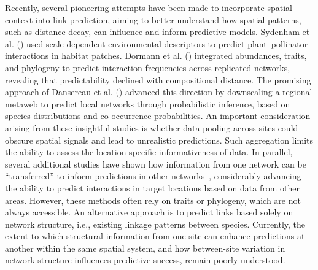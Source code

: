 \documentclass[oneside, a4paper, onecolumn, 11pt]{article}
\begin{document}
Recently, several pioneering attempts have been made to incorporate spatial context into link prediction, aiming to better understand how spatial patterns, such as distance decay, can influence and inform predictive models. Sydenham et al. (\citeyear{Sydenham2022-me}) used scale-dependent environmental descriptors to predict plant–pollinator interactions in habitat patches. Dormann et al. (\citeyear{Dormann2025-rz}) integrated abundances, traits, and phylogeny to predict interaction frequencies across replicated networks, revealing that predictability declined with compositional distance. The promising approach of Dansereau et al. (\citeyear{Dansereau2024-wt}) advanced this direction by downscaling a regional metaweb to predict local networks through probabilistic inference, based on species distributions and co-occurrence probabilities. An important consideration arising from these insightful studies is whether data pooling across sites could obscure spatial signals and lead to unrealistic predictions. Such aggregation limits the ability to assess the location-specific informativeness of data. In parallel, several additional studies have shown how information from one network can be ``transferred'' to inform predictions in other networks~\citep{Strydom2023-rc,Caron2024-as,Nunes-Martinez2024-uw,Biton2025-jj}, considerably advancing the ability to predict interactions in target locations based on data from other areas. However, these methods often rely on traits or phylogeny, which are not always accessible. An alternative approach is to predict links based solely on network structure, i.e., existing linkage patterns between species. Currently, the extent to which structural information from one site can enhance predictions at another within the same spatial system, and how between-site variation in network structure influences predictive success, remain poorly understood.
\end{document}
